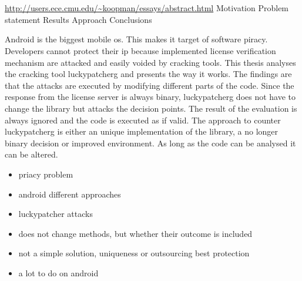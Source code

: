 \chapter{\abstractname}
\url{http://users.ece.cmu.edu/~koopman/essays/abstract.html}
Motivation
Problem statement
Results
Approach
Conclusions

Android is the biggest mobile \gls{os}.
This makes it target of software piracy.
Developers cannot protect their \gls{ip} because implemented license verification mechanism are attacked and easily voided by cracking tools.
This thesis analyses the cracking tool \gls{luckypatcherg} and presents the way it works.
The findings are that the attacks are executed by modifying different parts of the code.
Since the response from the license server is always binary, \gls{luckypatcherg} does not have to change the library but attacks the decision points.
The result of the evaluation is always ignored and the code is executed as if valid.
The approach to counter \gls{luckypatcherg} is either an unique implementation of the library, a no longer binary decision or improved environment.
As long as the code can be analysed it can be altered.

\begin{itemize}
  \item priacy problem
  \item android different approaches
  \item luckypatcher attacks
  \item does not change methods, but whether their outcome is included
  \item not a simple solution, uniqueness or outsourcing best protection
  \item a lot to do on android
\end{itemize}
